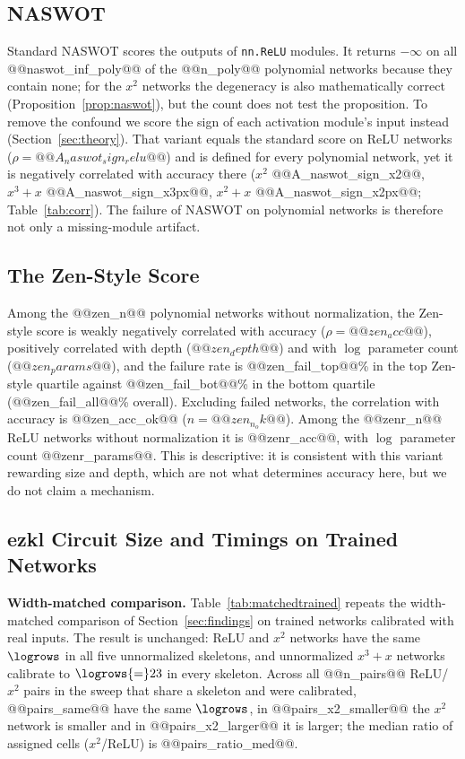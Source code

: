\subsection{NASWOT}

Standard NASWOT scores the outputs of \texttt{nn.ReLU} modules.  It returns $-\infty$ on all @@naswot_inf_poly@@ of the @@n_poly@@ polynomial networks because they contain none; for the $x^2$ networks the degeneracy
is also mathematically correct (Proposition~\ref{prop:naswot}), but the count does not test the proposition.  To remove the confound we score the sign of each activation module's input instead
(Section~\ref{sec:theory}).  That variant equals the standard score on ReLU networks ($\rho=@@A_naswot_sign_relu@@$) and is defined for every polynomial network, yet it is negatively correlated with accuracy there
($x^2$ @@A_naswot_sign_x2@@, $x^3{+}x$ @@A_naswot_sign_x3px@@, $x^2{+}x$ @@A_naswot_sign_x2px@@; Table~\ref{tab:corr}).  The failure of NASWOT on polynomial networks is
therefore not only a missing-module artifact.



\subsection{The Zen-Style Score}

Among the @@zen_n@@ polynomial networks without normalization, the Zen-style score is weakly negatively correlated with accuracy ($\rho=@@zen_acc@@$), positively correlated with depth ($@@zen_depth@@$)
and with $\log$ parameter count ($@@zen_params@@$), and the failure rate is @@zen_fail_top@@\% in the top Zen-style quartile against @@zen_fail_bot@@\% in the bottom quartile
(@@zen_fail_all@@\% overall).  Excluding failed networks, the correlation with accuracy is @@zen_acc_ok@@ ($n=@@zen_n_ok@@$).  Among the @@zenr_n@@ ReLU networks without normalization it is @@zenr_acc@@, with $\log$ parameter count @@zenr_params@@.
This is descriptive: it is consistent with this variant rewarding size and depth, which are not what determines accuracy here, but we do not claim a mechanism.

\subsection{ezkl Circuit Size and Timings on Trained Networks}
\label{sec:ezkltrained}

\textbf{Width-matched comparison.}  Table~\ref{tab:matchedtrained} repeats the width-matched comparison of Section~\ref{sec:findings} on trained networks calibrated with real inputs.
The result is unchanged: ReLU and $x^2$ networks have the same $\logrows$ in all five unnormalized skeletons, and unnormalized $x^3{+}x$ networks calibrate to $\logrows{=}23$ in every skeleton.
Across all @@n_pairs@@ ReLU/$x^2$ pairs in the sweep that share a skeleton and were calibrated, @@pairs_same@@ have the same $\logrows$, in @@pairs_x2_smaller@@ the $x^2$ network is smaller and in @@pairs_x2_larger@@ it is larger; the median
ratio of assigned cells ($x^2$/ReLU) is @@pairs_ratio_med@@.

